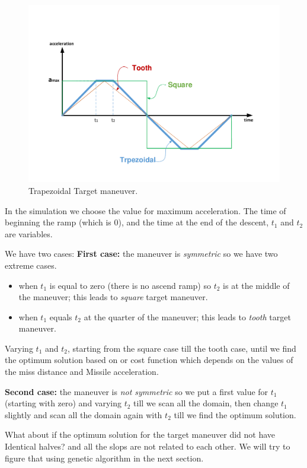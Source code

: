 \begin{figure}[htb]
	\centering
	\includegraphics[scale = 0.65]{fig/toothSquareTrapezoidal.pdf}
	\caption{Trapezoidal Target maneuver.}
	\label{trapezoidalacc}
\end{figure}
In the simulation we choose the value for maximum acceleration. The time of beginning the ramp (which is 0), and the time at the end of the descent, $t_1$ and $t_2$ are variables. 

We have two cases: \textbf{First case:} the maneuver is \textit{symmetric} so we have two extreme cases.
\begin{itemize}
	\item when $t_1$ is equal to zero (there is no ascend ramp)  so $t_2$ is at the middle of the maneuver; this leads to \textit{square} target maneuver.
	\item when $t_1$ equals $t_2$ at the quarter of the maneuver; this leads to \textit{tooth} target maneuver.  
\end{itemize}
Varying $t_1$ and $t_2$, starting from the square case till the tooth case, until we find the optimum solution based on or cost function which depends on the values of the miss distance and Missile acceleration. 


\textbf{Second case:} the maneuver is \textit{not symmetric} so we put a first value for $t_1$ (starting with zero) and varying $t_2$ till we scan all the domain, then change $t_1$ slightly and scan all the domain again with $t_2$ till we find the optimum solution.

What about if the optimum solution for the target maneuver did not have Identical halves? and all the slops are not related to each other. We will try to figure that using genetic algorithm in the next section.

